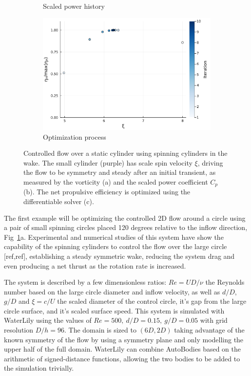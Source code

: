 \documentclass[final,3p,times]{elsarticle}
\begin{document}
\begin{figure}
\begin{subfigure}[b]{0.45\linewidth}
        \caption{Scaled power history}
    \end{subfigure}\hspace{20}
    \begin{subfigure}[b]{0.45\linewidth}
        \centering
        \includegraphics[width=\linewidth]{img/SpinOptim.png}        
        \caption{Optimization process}
    \end{subfigure}
    \caption{Controlled flow over a static cylinder using spinning cylinders in the wake. The small cylinder (purple) has scale spin velocity $\xi$, driving the flow to be symmetry and steady after an initial transient, as measured by the vorticity (a) and the scaled power coefficient $C_p$ (b). The net propulsive efficiency is optimized using the differentiable solver (c).}
    \label{fig:spinning_circle}
\end{figure}

The first example will be optimizing the controlled 2D flow around a circle using a pair of small spinning circles placed 120 degrees relative to the inflow direction, Fig~\ref{fig:spinning_circle}a. Experimental and numerical studies of this system have show the capability of the spinning cylinders to control the flow over the large circle [ref,ref], establishing a steady symmetric wake, reducing the system drag and even producing a net thrust as the rotation rate is increased.

The system is described by a few dimensionless ratios: $Re=UD/\nu$ the Reynolds number based on the large circle diameter and inflow velocity, as well as $d/D$, $g/D$ and $\xi=c/U$ the scaled diameter of the control circle, it's gap from the large circle surface, and it's scaled surface speed. This system is simulated with WaterLily using the values of $Re=500,\ d/D=0.15,\ g/D=0.05$ with grid resolution $D/h=96$. The domain is sized to $(6D,2D)$ taking advantage of the known symmetry of the flow by using a symmetry plane and only modelling the upper half of the full domain. WaterLily can combine AutoBodies based on the arithmetic of signed-distance functions, allowing the two bodies to be added to the simulation trivially.
\end{document}
